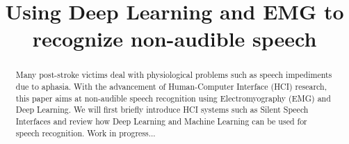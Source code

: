 \documentclass[conference]{IEEEtran}
\begin{document}
%
\title{Using Deep Learning and EMG to recognize non-audible speech}


\author{
}


%





\maketitle

\begin{abstract}
Many post-stroke victims deal with physiological problems such as speech impediments due to aphasia. With the advancement of Human-Computer Interface (HCI) research, this paper aims at non-audible speech recognition using Electromyography (EMG) and Deep Learning. We will first briefly introduce HCI systems such as Silent Speech Interfaces and review how Deep Learning and Machine Learning can be used for speech recognition. Work in progress...
\end{abstract}
                                                                                                                                                        
\end{document}
